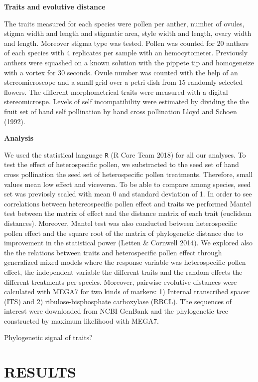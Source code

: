 \documentclass[11pt,a4paper]{article}
\begin{document}
\textbf{Traits and evolutive distance}

The traits measured for each species were pollen per anther, number of
ovules, stigma width and length and stigmatic area, style width and
length, ovary width and length. Moreover stigma type was tested. Pollen
was counted for 20 anthers of each species with 4 replicates per sample
with an hemocytometer. Previously anthers were squashed on a known
solution with the pippete tip and homogeneize with a vortex for 30
seconds. Ovule number was counted with the help of an stereomicroscope
and a small grid over a petri dish from 15 randomly selected flowers.
The different morphometrical traits were measured with a digital
stereomicrospe. Levels of self incompatibility were estimated by
dividing the the fruit set of hand self pollination by hand cross
pollination Lloyd and Schoen (1992).

\textbf{Analysis}

We used the statistical language \texttt{R} (R Core Team 2018) for all
our analyses. To test the effect of heterospecific pollen, we
substracted to the seed set of hand cross pollination the seed set of
heterospecific pollen treatments. Therefore, small values mean low
effect and viceversa. To be able to compare among species, seed set was
previosly scaled with mean 0 and standard deviation of 1. In order to
see correlations between hetereospecific pollen effect and traits we
performed Mantel test between the matrix of effect and the distance
matrix of each trait (euclidean distances). Moreover, Mantel test was
also conducted between heterospecific pollen effect and the square root
of the matrix of phylogenetic distance due to improvement in the
statistical power (Letten \& Cornwell 2014). We explored also the the
relations between traits and heterospecific pollen effect through
generalized mixed models where the response variable was heterospecific
pollen effect, the independent variable the different traits and the
random effects the different treatments per species. Moreover, pairwise
evolutive distances were calculated with MEGA7 for two kinds of markers:
1) Internal transcribed spacer (ITS) and 2) ribulose-bisphosphate
carboxylase (RBCL). The sequences of interest were downloaded from NCBI
GenBank and the phylogenetic tree constructed by maximum likelihood with
MEGA7.

Phylogenetic signal of traits?

\newpage

\section{RESULTS}\label{results}
\end{document}
